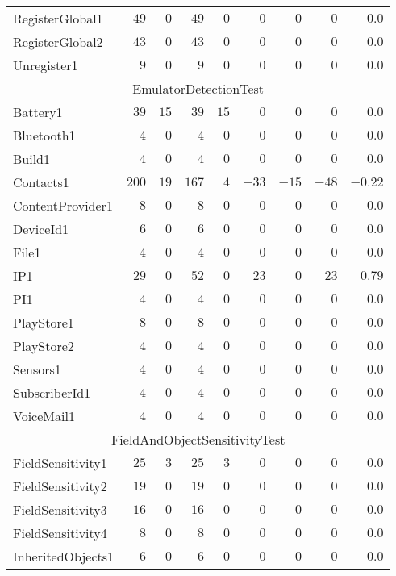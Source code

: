 \documentclass[../draft.tex]{subfiles}
\newcommand{\tsubEight}[1]{\multicolumn{9}{c}{#1}\\\hline}
\begin{document}
\begin{longtable}{l | r | r | r | r | r | r | r | r}
        RegisterGlobal1 & $49$ & $0$ & $49$ & $0$ & $0$ & $0$ & $0$ & $0.0$\\
        RegisterGlobal2 & $43$ & $0$ & $43$ & $0$ & $0$ & $0$ & $0$ & $0.0$\\
        Unregister1 & $9$ & $0$ & $9$ & $0$ & $0$ & $0$ & $0$ & $0.0$\\
        \hline
        \tsubEight{EmulatorDetectionTest}
        Battery1 & $39$ & $15$ & $39$ & $15$ & $0$ & $0$ & $0$ & $0.0$\\
        Bluetooth1 & $4$ & $0$ & $4$ & $0$ & $0$ & $0$ & $0$ & $0.0$\\
        Build1 & $4$ & $0$ & $4$ & $0$ & $0$ & $0$ & $0$ & $0.0$\\
        Contacts1 & $200$ & $19$ & $167$ & $4$ & $-33$ & $-15$ & $-48$ & $-0.22$\\
        ContentProvider1 & $8$ & $0$ & $8$ & $0$ & $0$ & $0$ & $0$ & $0.0$\\
        DeviceId1 & $6$ & $0$ & $6$ & $0$ & $0$ & $0$ & $0$ & $0.0$\\
        File1 & $4$ & $0$ & $4$ & $0$ & $0$ & $0$ & $0$ & $0.0$\\
        IP1 & $29$ & $0$ & $52$ & $0$ & $23$ & $0$ & $23$ & $0.79$\\
        PI1 & $4$ & $0$ & $4$ & $0$ & $0$ & $0$ & $0$ & $0.0$\\
        PlayStore1 & $8$ & $0$ & $8$ & $0$ & $0$ & $0$ & $0$ & $0.0$\\
        PlayStore2 & $4$ & $0$ & $4$ & $0$ & $0$ & $0$ & $0$ & $0.0$\\
        Sensors1 & $4$ & $0$ & $4$ & $0$ & $0$ & $0$ & $0$ & $0.0$\\
        SubscriberId1 & $4$ & $0$ & $4$ & $0$ & $0$ & $0$ & $0$ & $0.0$\\
        VoiceMail1 & $4$ & $0$ & $4$ & $0$ & $0$ & $0$ & $0$ & $0.0$\\
        \hline
        \tsubEight{FieldAndObjectSensitivityTest}
        FieldSensitivity1 & $25$ & $3$ & $25$ & $3$ & $0$ & $0$ & $0$ & $0.0$\\
        FieldSensitivity2 & $19$ & $0$ & $19$ & $0$ & $0$ & $0$ & $0$ & $0.0$\\
        FieldSensitivity3 & $16$ & $0$ & $16$ & $0$ & $0$ & $0$ & $0$ & $0.0$\\
        FieldSensitivity4 & $8$ & $0$ & $8$ & $0$ & $0$ & $0$ & $0$ & $0.0$\\
        InheritedObjects1 & $6$ & $0$ & $6$ & $0$ & $0$ & $0$ & $0$ & $0.0$\\

\end{longtable}
\end{document}
